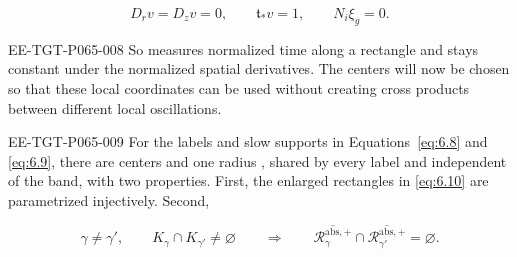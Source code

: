 \begin{equation}
 D_rv=D_zv=0,
 \qquad \mathfrak t_*v=1,
 \qquad N_i\xi_g=0.
 \tag{6.12}\label{eq:6.12}
\end{equation}
\begin{EESegment}{EE-TGT-P065-008}
So  measures normalized time along a rectangle and stays constant under the normalized spatial derivatives. The centers will now be chosen so that these local coordinates can be used without creating cross products between different local oscillations.
\end{EESegment}

\begin{lemma}\label{lem:6.1}
\begin{EESegment}{EE-TGT-P065-009}
For the labels  and slow supports  in Equations~\eqref{eq:6.8} and \eqref{eq:6.9}, there are centers  and one radius , shared by every label and independent of the band, with two properties. First, the enlarged rectangles in \eqref{eq:6.10} are parametrized injectively. Second,
\end{EESegment}
\begin{equation}
 \gamma\ne\gamma',\qquad K_\gamma\cap K_{\gamma'}\ne\varnothing
 \qquad\Longrightarrow\qquad
 \overline{\mathcal R_\gamma^{\mathrm{abs},+}}
 \cap
 \overline{\mathcal R_{\gamma'}^{\mathrm{abs},+}}
 =\varnothing.
 \tag{6.13}\label{eq:6.13}
\end{equation}
\end{lemma}
